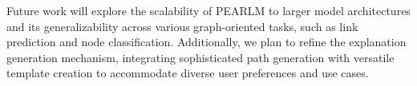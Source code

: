 \documentclass[sigconf]{acmart}
\begin{document}
Future work will explore the scalability of PEARLM to larger model architectures and its generalizability across various graph-oriented tasks, such as link prediction and node classification. Additionally, we plan to refine the explanation generation mechanism, integrating sophisticated path generation with versatile template creation to accommodate diverse user preferences and use cases.




\end{document}
